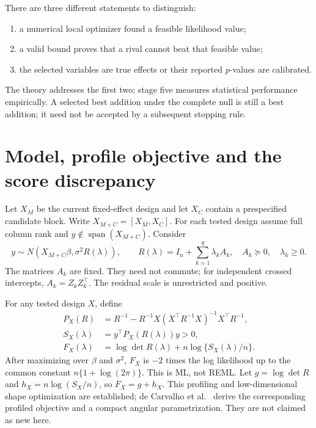\documentclass[11pt,a4paper]{article}
\theoremstyle{remark}\newtheorem{remark}[theorem]{Remark}
\newcommand{\Span}{\operatorname{span}}
\begin{document}
\begin{samepage}
There are three different statements to distinguish:
\begin{enumerate}
\item a numerical local optimizer found a feasible likelihood value;
\item a valid bound proves that a rival cannot beat that feasible value;
\item the selected variables are true effects or their reported $p$-values are calibrated.
\end{enumerate}
\end{samepage}
The theory addresses the first two; stage five measures statistical performance
empirically. A selected best addition under the complete
null is still a best addition; it need not be accepted by a subsequent stopping rule.

\section{Model, profile objective and the score discrepancy}
Let $X_M$ be the current fixed-effect design and let $X_C$ contain a prespecified
candidate block. Write $X_{M+C}=[X_M,X_C]$. For each tested design assume full column
rank and $y\notin\Span(X_{M+C})$. Consider
\begin{equation}\label{eq:model}
y\sim N(X_{M+C}\beta,\sigma^2R(\lambda)),\qquad
R(\lambda)=I_n+\sum_{k=1}^q\lambda_kA_k,
\quad A_k\succeq0,\quad \lambda_k\geq0.
\end{equation}
The matrices $A_k$ are fixed. They need not commute; for independent crossed
intercepts, $A_k=Z_kZ_k^\top$. The residual scale is unrestricted and positive.

For any tested design $X$, define
\begin{align}
P_X(R)&=R^{-1}-R^{-1}X(X^\top R^{-1}X)^{-1}X^\top R^{-1},\\
S_X(\lambda)&=y^\top P_X(R(\lambda))y>0,\\
F_X(\lambda)&=\log\det R(\lambda)+n\log\{S_X(\lambda)/n\}.
\end{align}
After maximizing over $\beta$ and $\sigma^2$, $F_X$ is $-2$ times the log likelihood
up to the common constant $n\{1+\log(2\pi)\}$. This is ML, not REML.
Let $g=\log\det R$ and $h_X=n\log(S_X/n)$, so $F_X=g+h_X$.
This profiling and low-dimensional shape optimization are established;
de Carvalho et al.~\cite{carvalho} derive the corresponding profiled objective
and a compact angular parametrization. They are not claimed as new here.
\end{document}
